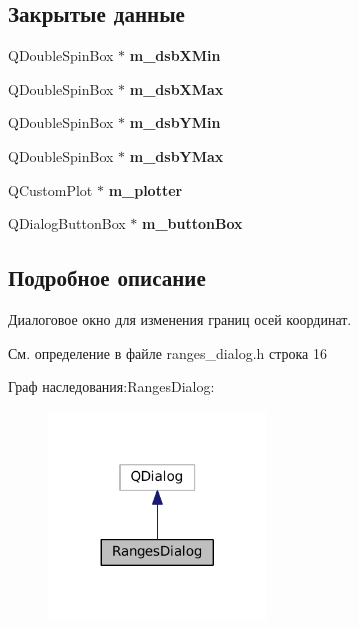 \subsection*{Закрытые данные}
\begin{DoxyCompactItemize}
\item 
\hypertarget{class_ranges_dialog_aa7e90336b7f703eda2d04b74cc29b1f1}{}\label{class_ranges_dialog_aa7e90336b7f703eda2d04b74cc29b1f1} 
Q\+Double\+Spin\+Box $\ast$ {\bfseries m\+\_\+dsb\+X\+Min}
\item 
\hypertarget{class_ranges_dialog_a336a353a6730dc45cbac777808b6c368}{}\label{class_ranges_dialog_a336a353a6730dc45cbac777808b6c368} 
Q\+Double\+Spin\+Box $\ast$ {\bfseries m\+\_\+dsb\+X\+Max}
\item 
\hypertarget{class_ranges_dialog_a5ca6eae82b600f510d7e0e45bd0c254a}{}\label{class_ranges_dialog_a5ca6eae82b600f510d7e0e45bd0c254a} 
Q\+Double\+Spin\+Box $\ast$ {\bfseries m\+\_\+dsb\+Y\+Min}
\item 
\hypertarget{class_ranges_dialog_a2b993d1980494d1dcd45a9f432c04c39}{}\label{class_ranges_dialog_a2b993d1980494d1dcd45a9f432c04c39} 
Q\+Double\+Spin\+Box $\ast$ {\bfseries m\+\_\+dsb\+Y\+Max}
\item 
\hypertarget{class_ranges_dialog_a68fd573fcf8e4c35716edca9b983ee16}{}\label{class_ranges_dialog_a68fd573fcf8e4c35716edca9b983ee16} 
Q\+Custom\+Plot $\ast$ {\bfseries m\+\_\+plotter}
\item 
\hypertarget{class_ranges_dialog_abd076dcdfac169f18d61b361478fa523}{}\label{class_ranges_dialog_abd076dcdfac169f18d61b361478fa523} 
Q\+Dialog\+Button\+Box $\ast$ {\bfseries m\+\_\+button\+Box}
\end{DoxyCompactItemize}


\subsection{Подробное описание}
Диалоговое окно для изменения границ осей координат. 

См. определение в файле ranges\+\_\+dialog.\+h строка 16



Граф наследования\+:Ranges\+Dialog\+:\nopagebreak
\begin{figure}[H]
\begin{center}
\leavevmode
\includegraphics[width=164pt]{class_ranges_dialog__inherit__graph}
\end{center}
\end{figure}


